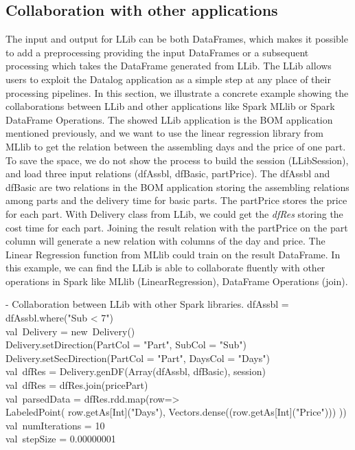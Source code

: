 \subsection{Collaboration with other applications}
The input and output for LLib can be both DataFrames, which makes it possible to add a preprocessing  providing the input DataFrames  or  a subsequent processing which takes the DataFrame generated from LLib. The LLib allows users to exploit the Datalog application as a simple step at any place of their  processing pipelines. In this section, we illustrate a concrete example showing the collaborations between LLib and other applications like Spark MLlib or Spark DataFrame Operations. The showed LLib application is the BOM application mentioned previously, and we want to use the linear regression library from MLlib to get the relation between the assembling days and the price of one part. To save the space, we do not show the process to build the session (LLibSession), and load three input relations (dfAssbl, dfBasic, partPrice).  The dfAssbl and dfBasic are two relations in the BOM application storing the assembling relations among parts and the delivery time for basic parts. The partPrice stores the price for each part. With Delivery class from LLib, we could get the \textit{dfRes} storing the cost time for each part. Joining the result relation with the partPrice on the part column will generate a new relation with columns of the day and price. The Linear Regression function from MLlib could train on the result DataFrame. In this example, we can find the  LLib is able to collaborate fluently with other operations in Spark like MLlib (LinearRegression), DataFrame Operations (join).

\vspace{0.5em}
 - Collaboration between LLib with other Spark libraries.
\bldl
dfAssbl = dfAssbl.where("Sub < 7")\\
val\ Delivery = new\ Delivery()\\
Delivery.setDirection(PartCol = "Part", SubCol = "Sub")\\
Delivery.setSecDirection(PartCol = "Part", DaysCol = "Days")\\
val\ dfRes = Delivery.genDF(Array(dfAssbl, dfBasic), session)\\
val\ dfRes = dfRes.join(pricePart)\\ 
val\ parsedData = dfRes.rdd.map(row=>\\ LabeledPoint(
row.getAs[Int]("Days"),
Vectors.dense((row.getAs[Int]("Price")))
))\\
val\ numIterations = 10 \\
val\ stepSize = 0.00000001 \\

